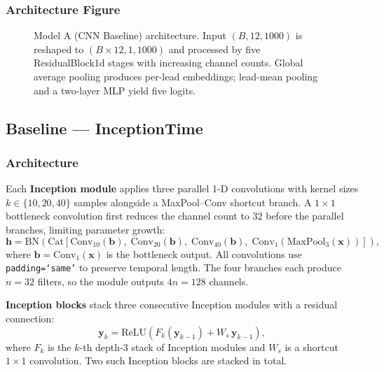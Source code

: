 \subsubsection{Architecture Figure}

\begin{figure}[htbp]
  \centering
  \caption{Model A (CNN Baseline) architecture.
    Input $(B, 12, 1000)$ is reshaped to $(B{\times}12, 1, 1000)$
    and processed by five ResidualBlock1d stages with increasing
    channel counts. Global average pooling produces per-lead embeddings;
    lead-mean pooling and a two-layer MLP yield five logits.}
  \label{fig:model_a}
\end{figure}

\subsection{Baseline --- InceptionTime}
\label{subsec:inception}

\subsubsection{Architecture}

Each \textbf{Inception module} applies three parallel 1-D convolutions
with kernel sizes $k \in \{10, 20, 40\}$ samples alongside a
MaxPool--Conv shortcut branch.
A $1\times 1$ bottleneck convolution first reduces the channel count to
32 before the parallel branches, limiting parameter growth:
\begin{equation}
  \mathbf{h} = \mathrm{BN}\!\left(
    \mathrm{Cat}\!\left[
      \mathrm{Conv}_{10}(\mathbf{b}),\;
      \mathrm{Conv}_{20}(\mathbf{b}),\;
      \mathrm{Conv}_{40}(\mathbf{b}),\;
      \mathrm{Conv}_1(\mathrm{MaxPool}_3(\mathbf{x}))
    \right]
  \right),
  \label{eq:inception_module}
\end{equation}
where $\mathbf{b} = \mathrm{Conv}_1(\mathbf{x})$ is the bottleneck
output.
All convolutions use \texttt{padding=`same'} to preserve temporal length.
The four branches each produce $n = 32$ filters, so the module outputs
$4n = 128$ channels.

\textbf{Inception blocks} stack three consecutive Inception modules with
a residual connection:
\begin{equation}
  \mathbf{y}_k = \mathrm{ReLU}\!\left(
    F_k(\mathbf{y}_{k-1}) + W_s\,\mathbf{y}_{k-1}
  \right),
  \label{eq:inception_block}
\end{equation}
where $F_k$ is the $k$-th depth-3 stack of Inception modules and
$W_s$ is a shortcut $1\times 1$ convolution.
Two such Inception blocks are stacked in total.

